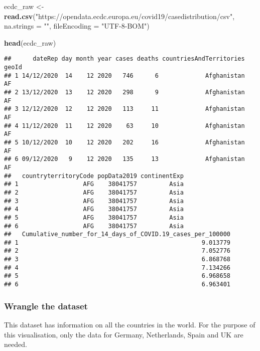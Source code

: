 \documentclass[
]{article}
\newenvironment{Shaded}{\begin{snugshade}}{\end{snugshade}}
\newcommand{\AttributeTok}[1]{\textcolor[rgb]{0.13,0.29,0.53}{#1}}
\newcommand{\FunctionTok}[1]{\textcolor[rgb]{0.13,0.29,0.53}{\textbf{#1}}}
\newcommand{\NormalTok}[1]{#1}
\newcommand{\OtherTok}[1]{\textcolor[rgb]{0.56,0.35,0.01}{#1}}
\newcommand{\StringTok}[1]{\textcolor[rgb]{0.31,0.60,0.02}{#1}}
\begin{document}
\begin{Shaded}
\begin{Highlighting}[]
\NormalTok{ecdc\_raw }\OtherTok{\textless{}{-}} \FunctionTok{read.csv}\NormalTok{(}\StringTok{"https://opendata.ecdc.europa.eu/covid19/casedistribution/csv"}\NormalTok{, }\AttributeTok{na.strings =} \StringTok{""}\NormalTok{, }\AttributeTok{fileEncoding =} \StringTok{"UTF{-}8{-}BOM"}\NormalTok{)}

\FunctionTok{head}\NormalTok{(ecdc\_raw)}
\end{Highlighting}
\end{Shaded}

\begin{verbatim}
##      dateRep day month year cases deaths countriesAndTerritories geoId
## 1 14/12/2020  14    12 2020   746      6             Afghanistan    AF
## 2 13/12/2020  13    12 2020   298      9             Afghanistan    AF
## 3 12/12/2020  12    12 2020   113     11             Afghanistan    AF
## 4 11/12/2020  11    12 2020    63     10             Afghanistan    AF
## 5 10/12/2020  10    12 2020   202     16             Afghanistan    AF
## 6 09/12/2020   9    12 2020   135     13             Afghanistan    AF
##   countryterritoryCode popData2019 continentExp
## 1                  AFG    38041757         Asia
## 2                  AFG    38041757         Asia
## 3                  AFG    38041757         Asia
## 4                  AFG    38041757         Asia
## 5                  AFG    38041757         Asia
## 6                  AFG    38041757         Asia
##   Cumulative_number_for_14_days_of_COVID.19_cases_per_100000
## 1                                                   9.013779
## 2                                                   7.052776
## 3                                                   6.868768
## 4                                                   7.134266
## 5                                                   6.968658
## 6                                                   6.963401
\end{verbatim}

\subsubsection{Wrangle the dataset}\label{wrangle-the-dataset}

This dataset has information on all the countries in the world. For the
purpose of this visualisation, only the data for Germany, Netherlands,
Spain and UK are needed.
\end{document}
